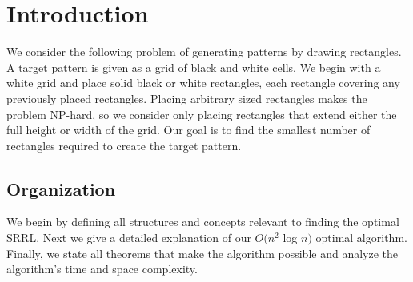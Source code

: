 \section{Introduction}
We consider the following problem of generating patterns by drawing rectangles.
A target pattern is given as a grid of black and white cells.
We begin with a white grid and place solid black or white rectangles,
each rectangle covering any previously placed rectangles.
Placing arbitrary sized rectangles makes the problem NP-hard, so we
consider only placing rectangles that extend either the full height or width of the grid.
Our goal is to find the smallest number of rectangles required to create the target pattern.
\label{s_intro}





\subsection{Organization}
We begin by defining all structures and concepts relevant to finding the optimal SRRL.
Next we give a detailed explanation of our $O(n^2$ log $n)$ optimal algorithm.
Finally, we state all theorems that make the algorithm possible and analyze the algorithm's time and space complexity.

